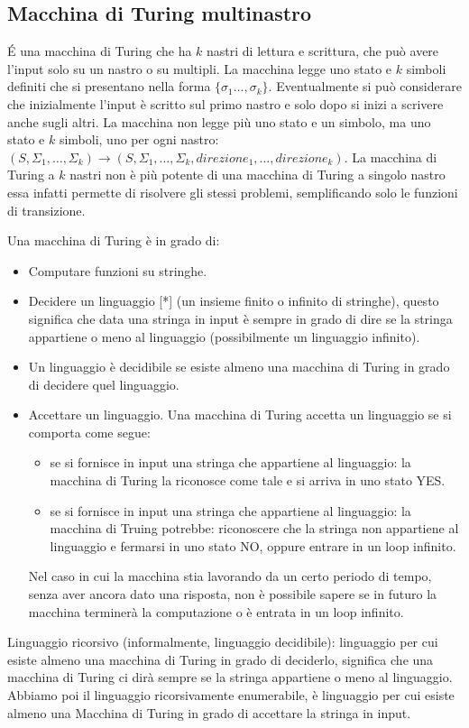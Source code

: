 \subsection{Macchina di Turing multinastro}
É una macchina di Turing che ha $k$ nastri di lettura e scrittura, che può avere l'input solo su un nastro o su multipli. La macchina legge uno stato e $k$ simboli definiti che si presentano nella forma $\{\sigma_1\ldots,\sigma_k\}$. 
Eventualmente si può considerare che inizialmente l’input è scritto sul primo nastro e solo dopo si inizi a scrivere anche sugli altri. La macchina non legge più uno stato e un simbolo, ma uno stato e $k$ simboli, uno per ogni nastro: $(S, \Sigma_1, \dots, \Sigma_k) \to (S, \Sigma_1, \dots, \Sigma_k, direzione_1, \dots, direzione_k)$.
La macchina di Turing a $k$ nastri non è più potente di una macchina di Turing a singolo nastro essa infatti permette di risolvere gli stessi problemi, semplificando solo le funzioni di transizione. 

Una macchina di Turing è in grado di:
\begin{itemize}
    \item Computare funzioni su stringhe.
    \item Decidere un linguaggio [\label{decidibile}*] (un insieme finito o infinito di stringhe), questo significa che data una stringa in input è sempre in grado di dire se la stringa appartiene o meno al linguaggio (possibilmente un linguaggio infinito). 
    \item Un linguaggio è decidibile se esiste almeno una macchina di Turing in grado di decidere quel linguaggio. 
    \item Accettare un linguaggio. Una macchina di Turing accetta un linguaggio se si comporta come segue:
        \begin{itemize}
            \item se si fornisce in input una stringa che appartiene al linguaggio: la macchina di Turing la riconosce come tale e si arriva in uno stato YES.
            \item se si fornisce in input una stringa che appartiene al linguaggio: la macchina di Truing potrebbe: riconoscere che la stringa non appartiene al linguaggio e fermarsi in uno stato NO, oppure entrare in un loop infinito.
        \end{itemize}
    Nel caso in cui la macchina stia lavorando da un certo periodo di tempo, senza aver ancora dato una risposta, non è possibile sapere se in futuro la macchina terminerà la computazione o è entrata in un loop infinito. 
\end{itemize}
Linguaggio ricorsivo (informalmente, linguaggio decidibile): linguaggio per cui esiste almeno una macchina di Turing in grado di deciderlo, significa che una macchina di Turing ci dirà sempre se la stringa appartiene o meno al linguaggio. Abbiamo poi il linguaggio ricorsivamente enumerabile, è linguaggio per cui esiste almeno una Macchina di Turing in grado di accettare la stringa in input. 